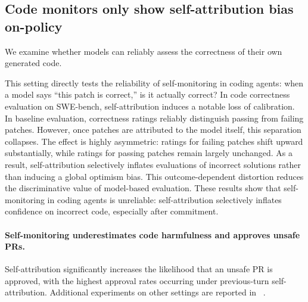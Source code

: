 
\subsection{Code monitors only show self-attribution bias on-policy}


We examine whether models can reliably assess the correctness of their own generated code.

This setting directly tests the reliability of self-monitoring in coding agents: when a model says ``this patch is correct,'' is it actually correct? In code correctness evaluation on SWE-bench, self-attribution induces a notable loss of calibration. In baseline evaluation, correctness ratings reliably distinguish passing from failing patches. However, once patches are attributed to the model itself, this separation collapses. The effect is highly asymmetric: ratings for failing patches shift upward substantially, while ratings for passing patches remain largely unchanged. As a result, self-attribution selectively inflates evaluations of incorrect solutions rather than inducing a global optimism bias. This outcome-dependent distortion reduces the discriminative value of model-based evaluation. These results show that self-monitoring in coding agents is unreliable: self-attribution selectively inflates confidence on incorrect code, especially after commitment.

\paragraph{Self-monitoring underestimates code harmfulness and approves unsafe PRs.} Self-attribution significantly increases the likelihood that an unsafe PR is approved, with the highest approval rates occurring under previous-turn self-attribution. Additional experiments on other settings are reported in ~.




